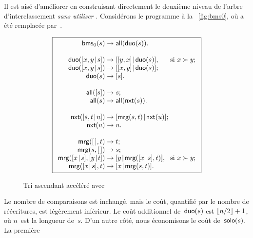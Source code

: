 Il est aisé d'améliorer  en construisant directement le
deuxième niveau de l'arbre d'interclassement \emph{sans utiliser }.
 Considérons le programme à la
\fig~\vref{fig:bms0}, où  a
été remplacée par~.
\begin{figure}
\begin{equation*}
\boxed{%
\begin{array}{r@{\;}l@{\;}l@{\;}l}
\fun{bms}_0(s)   & \rightarrow & \fun{all}(\fun{duo}(s)).\\
\\
\fun{duo}(\cons{x,y}{s}) & \rightarrow & \cons{[y,x]}{\fun{duo}(s)},
                                       & \text{si \(x \succ y\)};\\
\fun{duo}(\cons{x,y}{s}) & \rightarrow & \cons{[x,y]}{\fun{duo}(s)};\\
\fun{duo}(s)             & \rightarrow & [s].\\
\\
\fun{all}([s]) & \rightarrow & s;\\
\fun{all}(s)   & \rightarrow & \fun{all}(\fun{nxt}(s)).\\
\\
\fun{nxt}(\cons{s,t}{u}) & \rightarrow
                         & \cons{\fun{mrg}(s,t)}{\fun{nxt}(u)};\\
\fun{nxt}(u)             & \rightarrow & u.\\
\\
\fun{mrg}(\el,t)         & \rightarrow & t;\\
\fun{mrg}(s,\el)         & \rightarrow & s;\\
\fun{mrg}(\cons{x}{s},\cons{y}{t}) & \rightarrow
                         & \cons{y}{\fun{mrg}(\cons{x}{s},t)},
                         & \text{si \(x \succ y\)};\\
\fun{mrg}(\cons{x}{s},t) & \rightarrow & \cons{x}{\fun{mrg}(s,t)}.
\end{array}}
\end{equation*}
\caption{Tri ascendant accéléré avec }
\label{fig:bms0}
\end{figure}
Le nombre de comparaisons est inchangé, mais le coût, quantifié par le
nombre de réécritures, est légèrement inférieur. Le coût additionnel
de~\(\textsf{duo}(s)\) est \(\lfloor{n/2}\rfloor+1\), où
\(n\)~est la longueur de~\(s\). D'un autre côté, nous économisons le
coût de~\(\textsf{solo}(s)\). La première
